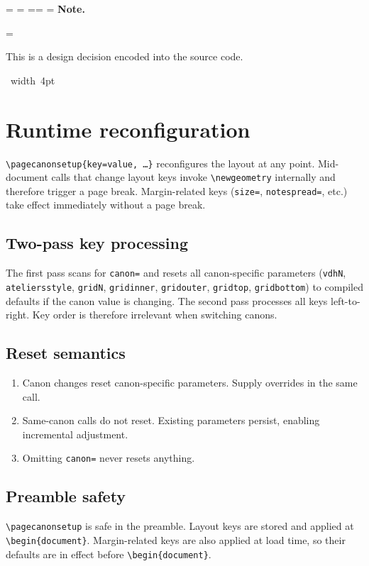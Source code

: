 \documentclass[11pt, twoside, openany]{book}
\makeatletter
\newcommand{\cmd}[1]{\texttt{\textbackslash #1}}
\newcommand*{\cns@tag@artifact@begin}{}
\newcommand*{\cns@tag@artifact@end}{}
\newenvironment{TodoNote}[1][]{%
  \par\addvspace{0.5\baselineskip plus 2pt}%
  \setbox\cns@box=\vbox\bgroup
    \hsize=\linewidth
    \advance\hsize -10pt
    \linewidth=\hsize \columnwidth=\hsize
    \parindent=\z@
    \noindent\textbf{\sffamily Note\cns@ifnotempty{#1}{ \textmd{(#1)}}.}%
    \par\nobreak
    \@afterindentfalse\@afterheading
    \leftskip=\cns@indent\relax
    \ignorespaces
}{%
  \par
  \egroup
  \vbox{\hbox{%
    \cns@tag@artifact@begin\vrule width 4pt\cns@tag@artifact@end
    \hskip 6pt\relax
    \box\cns@box
  }}%
  \par\addvspace{0.5\baselineskip plus 2pt}%
}
\makeatother
\begin{document}
\begin{TodoNote}
	This is a design decision encoded into the source code.
\end{TodoNote}


\chapter{Runtime reconfiguration}\label{chapter:reconfiguration}

\cmd{pagecanonsetup}\texttt{\{key=value, \ldots\}} reconfigures the layout at any point. Mid-document calls that change layout keys invoke \cmd{newgeometry} internally and therefore trigger a page break. Margin-related keys (\texttt{size=}, \texttt{notespread=}, etc.) take effect immediately without a page break.

\section{Two-pass key processing}\label{sec:twopass}

The first pass scans for \texttt{canon=} and resets all canon-specific parameters (\texttt{vdhN}, \texttt{ateliersstyle}, \texttt{gridN}, \texttt{gridinner}, \texttt{gridouter}, \texttt{gridtop}, \texttt{gridbottom}) to compiled defaults if the canon value is changing. The second pass processes all keys left-to-right. Key order is therefore irrelevant when switching canons.

\section{Reset semantics}\label{sec:reset}

\begin{enumerate}
	\item Canon changes reset canon-specific parameters. Supply overrides in the same call.
	\item Same-canon calls do not reset. Existing parameters persist, enabling incremental adjustment.
	\item Omitting \texttt{canon=} never resets anything.
\end{enumerate}

\section{Preamble safety}\label{sec:preamblesafety}

\cmd{pagecanonsetup} is safe in the preamble. Layout keys are stored and applied at \cmd{begin}\texttt{\{document\}}. Margin-related keys are also applied at load time, so their defaults are in effect before \cmd{begin}\texttt{\{document\}}.
\end{document}
